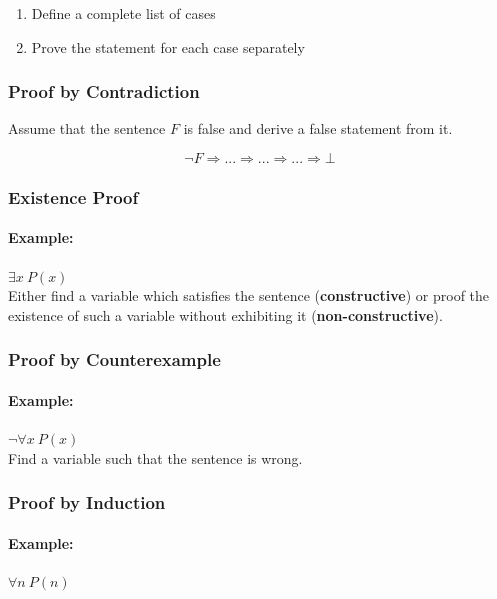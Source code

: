 \documentclass[11pt]{article}
\begin{document}
\begin{enumerate}
	\item Define a complete list of cases
	\item Prove the statement for each case separately
\end{enumerate}

\subsubsection{Proof by Contradiction}

Assume that the sentence $F$ is false and derive a false statement from it.

\begin{equation*}
	\neg F \Rightarrow ... \Rightarrow ... \Rightarrow ... \Rightarrow \bot
\end{equation*}

\subsubsection{Existence Proof}

\paragraph{Example:} $\exists x\ P(x)$ \\

Either find a variable which satisfies the sentence (\textbf{constructive}) or proof the existence of such a variable without exhibiting it (\textbf{non-constructive}).

\subsubsection{Proof by Counterexample}

\paragraph{Example:} $\neg\forall x\ P(x)$ \\

Find a variable such that the sentence is wrong.

\subsubsection{Proof by Induction}

\paragraph{Example:} $\forall n\ P(n)$ 
\end{document}
